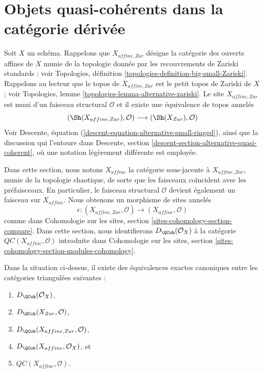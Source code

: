 \section{Objets quasi-cohérents dans la catégorie dérivée}
\label{section-QC}

\noindent
Soit $X$ un schéma. Rappelons que $X_{affine, Zar}$
désigne la catégorie des ouverts affines de $X$ munie de la topologie donnée
par les recouvrements de Zariski standards ; voir
Topologies, définition \ref{topologies-definition-big-small-Zariski}.
Rappelons au lecteur que le topos de $X_{affine, Zar}$
est le petit topos de Zariski de $X$ ; voir Topologies, lemme
\ref{topologies-lemma-alternative-zariski}. Le site $X_{affine, Zar}$
est muni d'un faisceau structural $\mathcal{O}$ et il existe une
équivalence de topos annelés
$$
(\Sh(X_{affine, Zar}), \mathcal{O})
\longrightarrow
(\Sh(X_{Zar}), \mathcal{O})
$$
Voir Descente, équation (\ref{descent-equation-alternative-small-ringed}),
ainsi que la discussion qui l'entoure dans
Descente, section \ref{descent-section-alternative-quasi-coherent},
où une notation légèrement différente est employée.

\medskip\noindent
Dans cette section, nous notons $X_{affine}$ la catégorie sous-jacente à
$X_{affine, Zar}$, munie de la topologie chaotique, de sorte que les faisceaux
coïncident avec les préfaisceaux. En particulier, le faisceau structural $\mathcal{O}$
devient également un faisceau sur $X_{affine}$.
Nous obtenons un morphisme de sites annelés
$$
\epsilon :
(X_{affine, Zar}, \mathcal{O})
\longrightarrow
(X_{affine}, \mathcal{O})
$$
comme dans Cohomologie sur les sites, section \ref{sites-cohomology-section-compare}.
Dans cette section, nous identifierons $D_\QCoh(\mathcal{O}_X)$ à
la catégorie $\mathit{QC}(X_{affine}, \mathcal{O})$ introduite dans
Cohomologie sur les sites, section \ref{sites-cohomology-section-modules-cohomology}.

\begin{lemma}
\label{lemma-DQCoh-alternative-small}
Dans la situation ci-dessus, il existe des équivalences exactes canoniques entre
les catégories triangulées suivantes :
\begin{enumerate}
\item $D_\QCoh(\mathcal{O}_X)$,
\item $D_\QCoh(X_{Zar}, \mathcal{O})$,
\item $D_\QCoh(X_{affine, Zar}, \mathcal{O})$,
\item $D_\QCoh(X_{affine}, \mathcal{O}_X)$, et
\item $\mathit{QC}(X_{affine}, \mathcal{O})$.
\end{enumerate}
\end{lemma}

